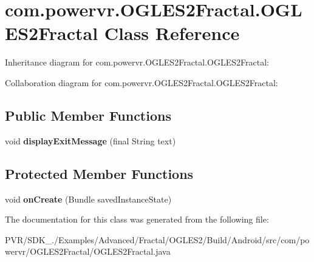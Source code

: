 \hypertarget{classcom_1_1powervr_1_1_o_g_l_e_s2_fractal_1_1_o_g_l_e_s2_fractal}{\section{com.\+powervr.\+O\+G\+L\+E\+S2\+Fractal.\+O\+G\+L\+E\+S2\+Fractal Class Reference}
\label{classcom_1_1powervr_1_1_o_g_l_e_s2_fractal_1_1_o_g_l_e_s2_fractal}
}


Inheritance diagram for com.\+powervr.\+O\+G\+L\+E\+S2\+Fractal.\+O\+G\+L\+E\+S2\+Fractal\+:


Collaboration diagram for com.\+powervr.\+O\+G\+L\+E\+S2\+Fractal.\+O\+G\+L\+E\+S2\+Fractal\+:
\subsection*{Public Member Functions}
\begin{DoxyCompactItemize}
\item 
\hypertarget{classcom_1_1powervr_1_1_o_g_l_e_s2_fractal_1_1_o_g_l_e_s2_fractal_a4ae8cc8c75db74d0e4af980bb318658e}{void {\bfseries display\+Exit\+Message} (final String text)}\label{classcom_1_1powervr_1_1_o_g_l_e_s2_fractal_1_1_o_g_l_e_s2_fractal_a4ae8cc8c75db74d0e4af980bb318658e}

\end{DoxyCompactItemize}
\subsection*{Protected Member Functions}
\begin{DoxyCompactItemize}
\item 
\hypertarget{classcom_1_1powervr_1_1_o_g_l_e_s2_fractal_1_1_o_g_l_e_s2_fractal_a633bad81b1b42434f91dff8c725ab45a}{void {\bfseries on\+Create} (Bundle saved\+Instance\+State)}\label{classcom_1_1powervr_1_1_o_g_l_e_s2_fractal_1_1_o_g_l_e_s2_fractal_a633bad81b1b42434f91dff8c725ab45a}

\end{DoxyCompactItemize}


The documentation for this class was generated from the following file\+:\begin{DoxyCompactItemize}
\item 
P\+V\+R/\+S\+D\+K\+\_./\+Examples/\+Advanced/\+Fractal/\+O\+G\+L\+E\+S2/\+Build/\+Android/src/com/powervr/\+O\+G\+L\+E\+S2\+Fractal/O\+G\+L\+E\+S2\+Fractal.\+java\end{DoxyCompactItemize}
